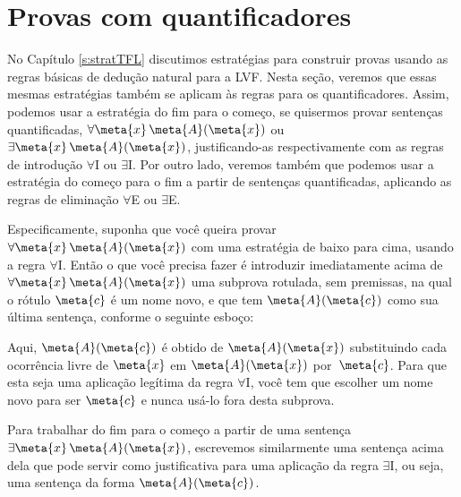   

\chapter{Provas com quantificadores}

No Capítulo \ref{s:stratTFL}  discutimos estratégias para construir provas usando as regras básicas de dedução natural para a LVF.  Nesta seção, veremos que essas mesmas estratégias também se aplicam às regras para os quantificadores. Assim, podemos usar a estratégia do fim para o começo, se quisermos provar sentenças quantificadas,  $\forall \meta{x}\, \atom{\meta{A}}{\meta{x}}$ ou $\exists \meta{x}\, \atom{\meta{A}}{\meta{x}}$, justificando-as respectivamente com as regras de introdução $\forall$I ou $\exists$I. Por outro lado, veremos também que podemos usar a estratégia do começo para o fim a partir de sentenças quantificadas, aplicando as regras de eliminação $\forall$E ou $\exists$E.

Especificamente, suponha que você queira provar $\forall \meta{x}\, \atom{\meta{A}}{\meta{x}}$ com uma estratégia de baixo para cima, usando a regra $\forall$I. Então o que você precisa fazer é introduzir imediatamente acima de $\forall \meta{x}\, \atom{\meta{A}}{\meta{x}}$ uma subprova rotulada, sem premissas, na qual o rótulo $\meta{c}$ é um nome novo, e que tem $\atom{\meta{A}}{\meta{c}}$ como sua última sentença, conforme o seguinte esboço:
 
\begin{fitchproof}
\open
	\ellipsesline
\close
\end{fitchproof}

 Aqui, $\atom{\meta{A}}{\meta{c}}$ é obtido de $\atom{\meta{A}}{\meta{x}}$ substituindo cada ocorrência livre de $\meta{x}$ em $\atom{\meta{A}}{\meta{x}}$ por~$\meta{c}$.  Para que esta seja uma aplicação legítima da regra  $\forall$I, você tem que escolher um nome novo para ser $\meta{c}$ e nunca usá-lo fora desta subprova.


Para trabalhar do fim para o começo  a partir de uma sentença $\exists \meta{x}\, \atom{\meta{A}}{\meta{x}}$, escrevemos similarmente uma sentença acima dela que pode servir como justificativa para uma aplicação da regra $\exists$I, ou seja, uma sentença da forma $\atom{\meta{A}}{\meta{c}}$. 
\begin{fitchproof}
	\ellipsesline
\end{fitchproof}

